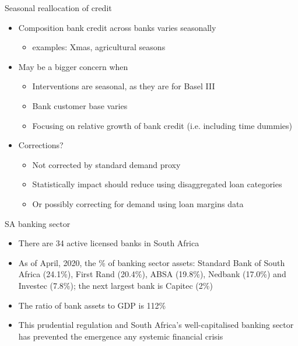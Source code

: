 \documentclass[
  14,
  ignorenonframetext,
  aspectratio=141,
]{beamer}
\providecommand{\tightlist}{%
  \setlength{\itemsep}{0pt}\setlength{\parskip}{0pt}}
\begin{document}
\begin{frame}{Seasonal reallocation of credit}
\protect\hypertarget{seasonal-reallocation-of-credit}{}
\begin{itemize}
\item Composition bank credit across banks varies seasonally  
\begin{itemize}
    \item examples: Xmas, agricultural seasons
\end{itemize}
\item May be a bigger concern when 
\begin{itemize}
    \item Interventions are seasonal, as they are for Basel III 
    \item Bank customer base varies 
    \item Focusing on relative growth of bank credit (i.e. including time dummies)
\end{itemize}
\item Corrections?
\begin{itemize}
    \item Not corrected by standard demand proxy  
    \item Statistically impact should reduce using disaggregated loan categories  
    \item Or possibly correcting for demand using loan margins data
\end{itemize}
\end{itemize}
\end{frame}

\begin{frame}{SA banking sector}
\protect\hypertarget{sa-banking-sector}{}
\begin{itemize}
\tightlist
\item
  There are 34 active licensed banks in South Africa
\item
  As of April, 2020, the \% of banking sector assets: Standard Bank of
  South Africa (24.1\%), First Rand (20.4\%), ABSA (19.8\%), Nedbank
  (17.0\%) and Investec (7.8\%); the next largest bank is Capitec (2\%)
\item
  The ratio of bank assets to GDP is 112\%
\item
  This prudential regulation and South Africa's well-capitalised banking
  sector has prevented the emergence any systemic financial crisis
\end{itemize}
\end{frame}
\end{document}
